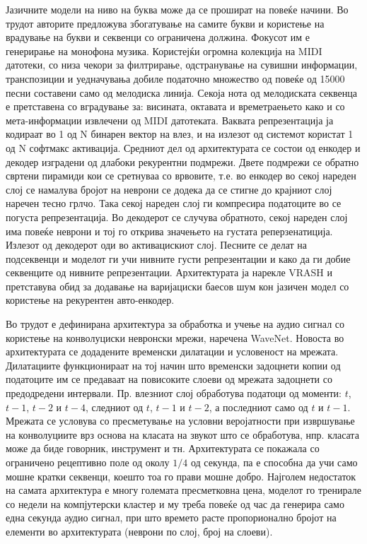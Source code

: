 Јазичните модели на ниво на буква може да се прошират на повеќе начини. Во трудот \cite{Tikhonov2017} авторите предложува збогатување на самите букви и користење на  врадување на букви и секвенци со ограничена должина. Фокусот им е генерирање на монофона музика. Користејќи огромна колекција на MIDI датотеки, со низа чекори за филтрирање, одстранување на сувишни информации, транспозиции и уедначувања добиле податочно множество од повеќе од 15000 песни составени само од мелодиска линија. Секоја нота од мелодиската секвенца е претставена со вградување за: висината, октавата и времетраењето како и со мета-информации извлечени од MIDI датотеката. Ваквата репрезентација ја кодираат во 1 од N бинарен вектор на влез, и на излезот од системот користат 1 од N софтмакс активација. Средниот дел од архитектурата се состои од енкодер и декодер изградени од длабоки рекурентни подмрежи. Двете подмрежи се обратно свртени пирамиди кои се сретнуваа со врвовите, т.е. во енкодер во секој нареден слој се намалува бројот на неврони се додека да се стигне до крајниот слој наречен тесно грлчо. Така секој нареден слој ги компресира податоците во се погуста репрезентација. Во декодерот се случува обратното, секој нареден слој има повеќе неврони и тој го открива значењето на густата реперзенатиција. Излезот од декодерот оди во активацискиот слој. Песните се делат на подсеквенци и моделот ги учи нивните густи репрезентации и како да ги добие секвенците од нивните репрезентации. Архитектурата ја нарекле VRASH и претставува обид за додавање на варијациски баесов шум кон јазичен модел со користење на рекурентен авто-енкодер.

Во трудот \cite{Oord2016} е дефинирана архитектура за обработка и учење на аудио сигнал со користење на конволуциски невронски мрежи, наречена WaveNet. Новоста во архитектурата се додадените временски дилатации и условеност на мрежата. Дилатациите функционираат на тој начин што временски задоцнети копии од податоците им се предаваат на повисоките слоеви од мрежата задоцнети со предодредени интервали. Пр. влезниот слој обработува податоци од моменти: $t$, $t-1$, $t-2$ и $t-4$, следниот од $t$, $t-1$ и $t-2$, а последниот само од $t$ и $t-1$. Мрежата се условува со пресметување на условни веројатности при извршување на конволуциите врз основа на класата на звукот што се обработува, нпр. класата може да биде говорник, инструмент и тн. Архитектурата се покажала со ограничено рецептивно поле од околу $1/4$ од секунда, па е способна да учи само мошне кратки секвенци, коешто тоа го прави мошне добро. Најголем недостаток на самата архитектура е многу големата пресметковна цена, моделот го тренирале со недели на компјутерски кластер и му треба повеќе од час да генерира само една секунда аудио сигнал, при што времето расте пропорионално бројот на елементи во архитектурата (неврони по слој, број на слоеви).

